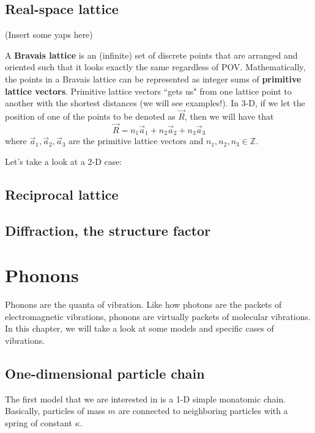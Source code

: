 \documentclass[12pt]{article}
\begin{document}
\subsection{Real-space lattice}
(Insert some yaps here)

\vspace{0.25in}

A \textbf{Bravais lattice} is an (infinite) set of discrete points that are arranged and oriented such that it looks exactly the same regardless of POV. Mathematically, the points in a Bravais lattice can be represented as integer sums of \textbf{primitive lattice vectors}. Primitive lattice vectors ``gets us" from one lattice point to another with the shortest distances (we will see examples!). In 3-D, if we let the position of one of the points to be denoted as $\vec{R}$, then we will have that
\begin{equation*}
    \vec{R}=n_1\vec{a}_1+n_2\vec{a}_2+n_3\vec{a}_3
\end{equation*}
where $\vec{a}_1, \vec{a}_2, \vec{a}_3$ are the primitive lattice vectors and $n_1,n_2,n_3\in\mathbb{Z}$.

\vspace{0.25in}

Let's take a look at a 2-D case:

\subsection{Reciprocal lattice}

\subsection{Diffraction, the structure factor}

\newpage

\section{Phonons}
Phonons are the quanta of vibration. Like how photons are the packets of electromagnetic vibrations, phonons are virtually packets of molecular vibrations. In this chapter, we will take a look at some models and specific cases of vibrations. 

\subsection{One-dimensional particle chain}
The first model that we are interested in is a 1-D simple monatomic chain. Basically, particles of mass $m$ are connected to neighboring particles with a spring of constant $\kappa$.
\end{document}
